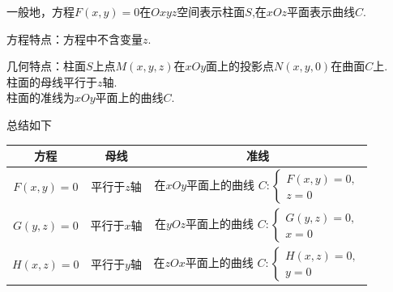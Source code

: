 \example[特殊的柱面方程]

\par  一般地，方程$F(x,y)=0$在$Oxyz$空间表示柱面$S$,在$xOz$平面表示曲线$C$.
\par {\color{dy}方程特点}：方程中不含变量$z$.
\par {\color{dy}几何特点}：柱面$S$上点$M(x,y,z)$在$xOy$面上的投影点$N(x,y,0)$在曲面$C$上.\\
\hspace*{7em}柱面的母线平行于$z$轴.\\
\hspace*{7em}柱面的准线为$xOy$平面上的曲线$C$.
\par 总结如下
\begin{center}
\begin{tabular}{|c|c|c|}
	\hline
	方程 &母线   &  准线    \\
	\hline
	 \hspace*{1em} $F(x,y)=0$ \hspace*{1em} &\hspace*{1em} 平行于$z$轴  \hspace*{1em}  & \hspace*{1em}  在$xOy$平面上的曲线
	$C:
	\begin{cases}
	F(x,y)=0,\\
	z=0
	\end{cases}
	$ \hspace*{1em}  \\
	\hline
\hspace*{1em} $G(y,z)=0$ \hspace*{1em}  &\hspace*{1em} 平行于$x$轴  \hspace*{1em}  & \hspace*{1em}  在$yOz$平面上的曲线
$C:
\begin{cases}
G(y,z)=0,\\
x=0
\end{cases}
$  \hspace*{1em}  \\
	\hline
\hspace*{1em} $H(x,z)=0$ \hspace*{1em} &\hspace*{1em} 平行于$y$轴  \hspace*{1em}  & \hspace*{1em} 在$zOx$平面上的曲线
$C:
\begin{cases}
H(x,z)=0,\\
y=0
\end{cases}
$\hspace*{1em} \\
	\hline
\end{tabular}
\end{center}

